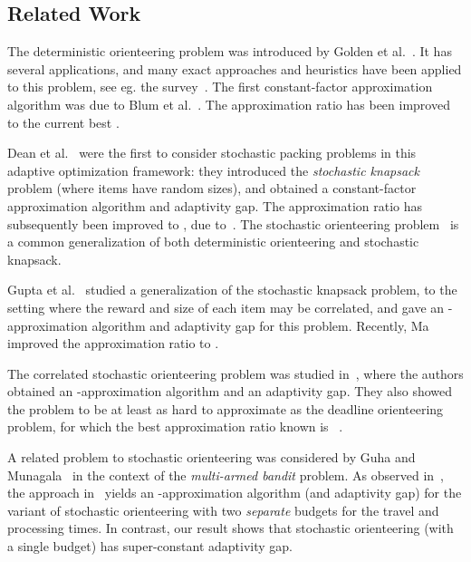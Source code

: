 \documentclass[11pt,letterpaper]{article}
\numberwithin{algorithm}{section}
\begin{document}
\subsection{Related Work}
\label{s:prev-work}
The deterministic orienteering problem was introduced by Golden et al.~\cite{GLV87}. It has several applications, and many exact approaches and heuristics have been applied to this problem, see eg. the survey~\cite{VSO11}. The first constant-factor approximation algorithm was due to Blum et al.~\cite{BCKLMM07}. The approximation ratio has been improved~\cite{BBCM04,CKP08} to the current best .



Dean et al.~\cite{DeanGV08} were the first to consider stochastic packing problems in this adaptive optimization framework: they introduced the {\em stochastic knapsack} problem (where items have random sizes), and obtained a constant-factor approximation algorithm and adaptivity gap. The approximation ratio has subsequently been improved to , due to~\cite{BGK11,Bhalgat11}. The stochastic orienteering problem~\cite{GKNR12} is a common generalization of both deterministic orienteering and stochastic knapsack.



Gupta et al.~\cite{GKMR11} studied a generalization of the stochastic knapsack problem, to the setting where the reward and size of each item  may be correlated, and gave an -approximation algorithm and adaptivity gap for this problem.
Recently, Ma~\cite{M14} improved the approximation ratio to .


The correlated stochastic orienteering problem was studied in~\cite{GKNR12}, where the authors obtained an -approximation algorithm and an  adaptivity gap. They also showed the  problem to be at least as hard to approximate as the deadline orienteering problem, for which the best approximation ratio known is ~\cite{BBCM04}.


A related problem to stochastic orienteering was considered by Guha and Munagala~\cite{GuhaM09} in the context of the {\em multi-armed bandit} problem. As observed in~\cite{GKNR12}, the approach in~\cite{GuhaM09} yields an -approximation algorithm (and adaptivity gap) for the variant of stochastic orienteering with two {\em separate} budgets for the travel and processing times. In contrast, our result shows that stochastic orienteering (with a single budget) has super-constant adaptivity gap.
\end{document}

